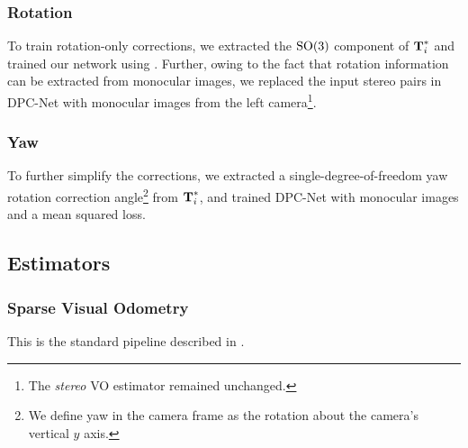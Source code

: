 \subsubsection{Rotation}
To train rotation-only corrections, we extracted the $\mathrm{SO}(3)$ component of  $\boldsymbol{\mathbf{T}}^*_i$ and trained our network using . Further, owing to the fact that rotation information can be extracted from monocular images, we replaced the input stereo pairs in DPC-Net with monocular images from the left camera\footnote{The \textit{stereo} VO estimator remained unchanged.}.

\subsubsection{Yaw}
To further simplify the corrections, we extracted a single-degree-of-freedom yaw rotation correction angle\footnote{We define yaw in the camera frame as the rotation about the camera's vertical $y$ axis.} from $\boldsymbol{\mathbf{T}}^*_i$, and trained DPC-Net with monocular images and a mean squared loss.


\subsection{Estimators}
\subsubsection{Sparse Visual Odometry}
This is the standard pipeline described in .
%

